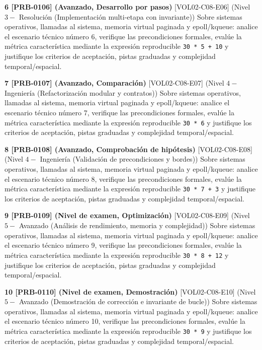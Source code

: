 \documentclass{book}
\begin{document}
\begin{tcolorbox}[title={Ejercicios}, studiumworked, breakable]
\noindent\textbf{6 [PRB-0106] (Avanzado, Desarrollo por pasos)}
[VOL02-C08-E06] (Nivel \(3 -\) Resolución (Implementación multi-etapa con invariante)) Sobre sistemas operativos, llamadas al sistema, memoria virtual paginada y epoll/kqueue: analice el escenario técnico número 6, verifique las precondiciones formales, evalúe la métrica característica mediante la expresión reproducible \texttt{30 * 5 + 10} y justifique los criterios de aceptación, pistas graduadas y complejidad temporal/espacial.

\noindent\textbf{7 [PRB-0107] (Avanzado, Comparación)}
[VOL02-C08-E07] (Nivel \(4 -\) Ingeniería (Refactorización modular y contratos)) Sobre sistemas operativos, llamadas al sistema, memoria virtual paginada y epoll/kqueue: analice el escenario técnico número 7, verifique las precondiciones formales, evalúe la métrica característica mediante la expresión reproducible \texttt{30 * 6} y justifique los criterios de aceptación, pistas graduadas y complejidad temporal/espacial.

\noindent\textbf{8 [PRB-0108] (Avanzado, Comprobación de hipótesis)}
[VOL02-C08-E08] (Nivel \(4 -\) Ingeniería (Validación de precondiciones y bordes)) Sobre sistemas operativos, llamadas al sistema, memoria virtual paginada y epoll/kqueue: analice el escenario técnico número 8, verifique las precondiciones formales, evalúe la métrica característica mediante la expresión reproducible \texttt{30 * 7 + 3} y justifique los criterios de aceptación, pistas graduadas y complejidad temporal/espacial.

\noindent\textbf{9 [PRB-0109] (Nivel de examen, Optimización)}
[VOL02-C08-E09] (Nivel \(5 -\) Avanzado (Análisis de rendimiento, memoria y complejidad)) Sobre sistemas operativos, llamadas al sistema, memoria virtual paginada y epoll/kqueue: analice el escenario técnico número 9, verifique las precondiciones formales, evalúe la métrica característica mediante la expresión reproducible \texttt{30 * 8 + 12} y justifique los criterios de aceptación, pistas graduadas y complejidad temporal/espacial.

\noindent\textbf{10 [PRB-0110] (Nivel de examen, Demostración)}
[VOL02-C08-E10] (Nivel \(5 -\) Avanzado (Demostración de corrección e invariante de bucle)) Sobre sistemas operativos, llamadas al sistema, memoria virtual paginada y epoll/kqueue: analice el escenario técnico número 10, verifique las precondiciones formales, evalúe la métrica característica mediante la expresión reproducible \texttt{30 * 9} y justifique los criterios de aceptación, pistas graduadas y complejidad temporal/espacial.


\end{tcolorbox}
\end{document}
